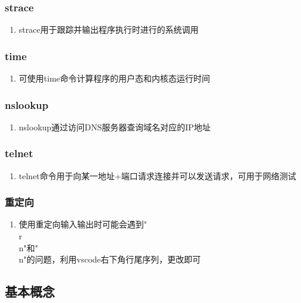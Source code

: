 \documentclass[onecolumn]{article}
\begin{document}
        \subsubsection{strace}
            \noindent
            \begin{enumerate}
                \item strace用于跟踪并输出程序执行时进行的系统调用
            \end{enumerate}
        \subsubsection{time}
            \noindent
            \begin{enumerate}
                \item 可使用time命令计算程序的用户态和内核态运行时间
            \end{enumerate}
        \subsubsection{nslookup}
            \noindent
            \begin{enumerate}
                \item nslookup通过访问DNS服务器查询域名对应的IP地址
            \end{enumerate}
        \subsubsection{telnet}
            \noindent
            \begin{enumerate}
                \item telnet命令用于向某一地址+端口请求连接并可以发送请求，可用于网络测试
            \end{enumerate}
        \subsubsection{重定向}
            \noindent
            \begin{enumerate}
                \item 使用重定向输入输出时可能会遇到"\\r\\n"和"\\n"的问题，利用vscode右下角行尾序列，更改即可
            \end{enumerate}
    \subsection{基本概念}
\end{document}
